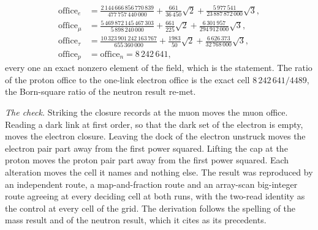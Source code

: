 \begin{chproof}
\begin{align}
\mathrm{office}_{e}&=\tfrac{2\,144\,666\,856\,770\,839}{477\,757\,440\,000}+\tfrac{661}{36\,450}\sqrt{2}+\tfrac{5\,977\,541}{23\,887\,872\,000}\sqrt{3},\\
\mathrm{office}_{\mu}&=\tfrac{5\,469\,872\,145\,467\,303}{5\,898\,240\,000}+\tfrac{661}{225}\sqrt{2}+\tfrac{6\,301\,957}{294\,912\,000}\sqrt{3},\\
\mathrm{office}_{\tau}&=\tfrac{10\,323\,901\,242\,163\,767}{655\,360\,000}+\tfrac{1983}{50}\sqrt{2}+\tfrac{6\,626\,373}{32\,768\,000}\sqrt{3},\\
\mathrm{office}_{p}&=\mathrm{office}_{n}=8\,242\,641 ,
\end{align}
every one an exact nonzero element of the field, which is the statement. The ratio of the proton office to the one-link electron office is the exact cell $8\,242\,641/4489$, the Born-square ratio of the neutron result re-met.

\textit{The check.} Striking the closure records at the muon moves the muon office. Reading a dark link at first order, so that the dark set of the electron is empty, moves the electron closure. Leaving the dock of the electron unstruck moves the electron pair part away from the first power squared. Lifting the cap at the proton moves the proton pair part away from the first power squared. Each alteration moves the cell it names and nothing else. The result was reproduced by an independent route, a map-and-fraction route and an array-scan big-integer route agreeing at every deciding cell at both runs, with the two-read identity as the control at every cell of the grid. The derivation follows the spelling of the mass result and of the neutron result, which it cites as its precedents.
\end{chproof}
